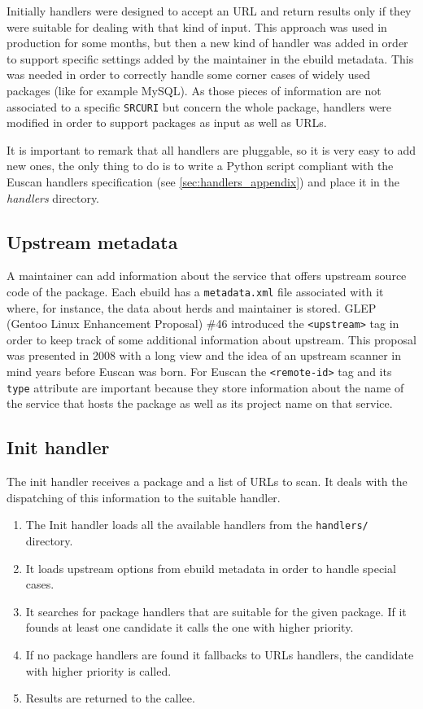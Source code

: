 Initially handlers were designed to accept an URL and return results only if they were suitable for dealing with that kind of input. This approach was used in production for some months, but then a new kind of handler was added in order to support specific settings added by the maintainer in the ebuild metadata. This was needed in order to correctly handle some corner cases of widely used packages (like for example MySQL). As those pieces of information are not associated to a specific \texttt{SRC\textunderscore URI} but concern the whole package, handlers were modified in order to support packages as input as well as URLs.

It is important to remark that all handlers are pluggable, so it is very easy to add new ones, the only thing to do is to write a Python script compliant with the Euscan handlers specification (see \ref{sec:handlers_appendix}) and place it in the \emph{handlers} directory.

\subsection{Upstream metadata}
A maintainer can add information about the service that offers upstream source code of the package. Each ebuild has a \texttt{metadata.xml} file associated with it where, for instance, the data about herds and maintainer is stored. GLEP (Gentoo Linux Enhancement Proposal) \#46 \cite{glep46} introduced the \texttt{<upstream>} tag in order to keep track of some additional information about upstream. This proposal was presented in 2008 with a long view and the idea of an upstream scanner in mind years before Euscan was born.
For Euscan the \texttt{<remote-id>} tag and its \texttt{type} attribute are important because they store information about the name of the service that hosts the package as well as its project name on that service.

\subsection{Init handler}
The init handler receives a package and a list of URLs to scan. It deals with the dispatching of this information to the suitable handler.
\begin{enumerate}
\item The Init handler loads all the available handlers from the \texttt{handlers/} directory.
\item It loads upstream options from ebuild metadata in order to handle special cases.
\item It searches for package handlers that are suitable for the given package. If it founds at least one candidate it calls the one with higher priority.
\item If no package handlers are found it fallbacks to URLs handlers, the candidate with higher priority is called.
\item Results are returned to the callee.
\end{enumerate}

